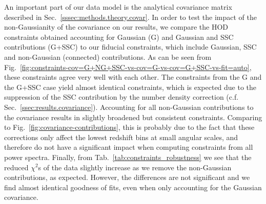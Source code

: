\documentclass[a4paper,11pt]{article}
\begin{document}
      An important part of our data model is the analytical covariance matrix described in Sec.~\ref{sssec:methods.theory.covar}. In order to test the impact of the non-Gaussianity of the covariance on our results, we compare the HOD constraints obtained accounting for Gaussian (G) and Gaussian and SSC contributions (G+SSC) to our fiducial constraints, which include Gaussian, SSC and non-Gaussian (connected) contributions. As can be seen from Fig.~\ref{fig:constraints-cov=G+NG+SSC-vs-cov=G-vs-cov=G+SSC-vs-fit=auto}, these constraints agree very well with each other. The constraints from the G and the G+SSC case yield almost identical constraints, which is expected due to the suppression of the SSC contribution by the number density correction (c.f. Sec.~\ref{ssec:results.covariance}). Accounting for all non-Gaussian contributions to the covariance results in slightly broadened but consistent constraints. Comparing to Fig.~\ref{fig:covariance-contributions}, this is probably due to the fact that these corrections only affect the lowest redshift bins at small angular scales, and therefore do not have a significant impact when computing constraints from all power spectra. Finally, from Tab.~\ref{tab:constraints_robustness} we see that the reduced $\chi^{2}$s of the data slightly increase as we remove the non-Gaussian contributions, as expected. However, the differences are not significant and we find almost identical goodness of fits, even when only accounting for the Gaussian covariance.
\end{document}
